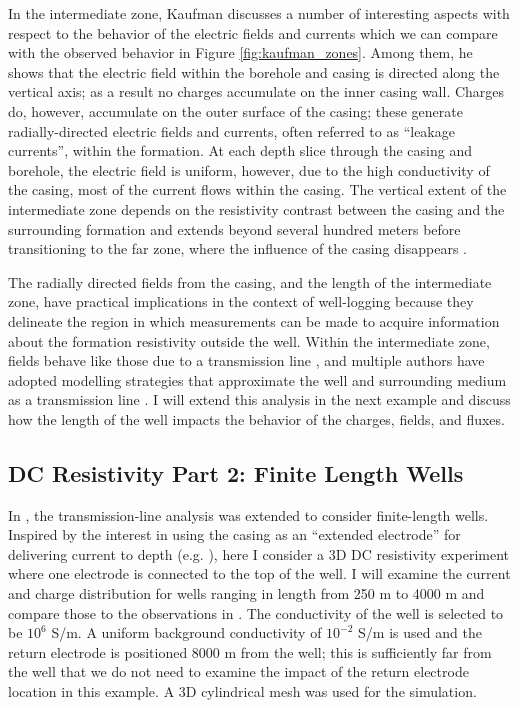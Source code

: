 In the intermediate zone, Kaufman discusses a number of interesting aspects with respect to  the behavior of the electric fields and currents which we can compare with the observed behavior in Figure \ref{fig:kaufman_zones}. Among them, he shows that the electric field within the borehole and casing is directed along the vertical axis; as a result no charges accumulate on the inner casing wall. Charges do, however, accumulate on the outer surface of the casing; these  generate radially-directed electric fields and currents, often referred to as “leakage currents”, within the formation. At each depth slice through the casing and borehole, the electric field is uniform, however, due to the high conductivity of the casing, most of the current flows within the casing.  The vertical extent of the intermediate zone depends on the resistivity contrast between the casing and the surrounding formation and extends beyond several hundred meters before transitioning to the far zone, where the influence of the casing disappears \citep{Kaufman1990}.

The radially directed fields from the casing, and the length of the intermediate zone, have practical implications in the context of well-logging because they delineate the region in which measurements can be made to acquire information about the formation resistivity outside the well. Within the intermediate zone, fields behave like those due to a transmission line \citep{Kaufman1990}, and multiple authors have adopted modelling strategies that approximate the well and surrounding medium as a transmission line \citep{Kong2009, Aldridge2015}. I will extend this analysis in the next example and discuss how the length of the well impacts the behavior of the charges, fields, and fluxes.
\subsection{DC Resistivity Part 2: Finite Length Wells}
\label{sec:dc_resistivity_part2}

In \citep{Kaufman1993}, the transmission-line analysis was extended to consider finite-length wells. Inspired by the interest in using the casing as an ``extended electrode'' for delivering current to depth (e.g. \cite{Schenkel1994, Um2015, Weiss2016, hoversten2017borehole}), here I consider a 3D DC resistivity experiment where one electrode is connected to the top of the well. I will examine the current and charge distribution for wells ranging in length from 250 m to 4000 m and compare those to the observations in \citep{Kaufman1993}. The conductivity of the well is selected to be $10^6$ S/m. A uniform background conductivity of $10^{-2}$ S/m is used and the return electrode is positioned 8000 m from the well; this is sufficiently far from the well that we do not need to examine the impact of the return electrode location in this example. A 3D cylindrical mesh was used for the simulation.

